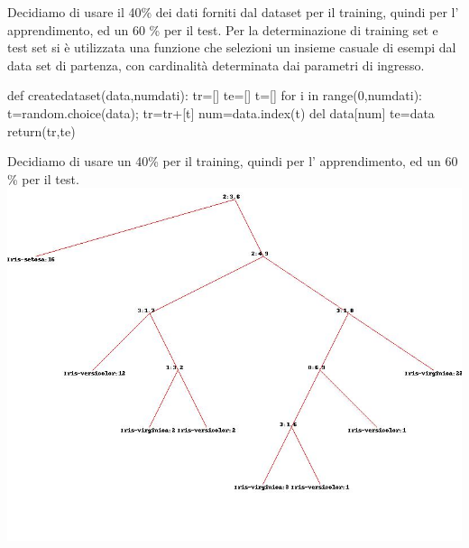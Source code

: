		Decidiamo di usare il 40\% dei dati forniti dal dataset per il training, quindi per l' apprendimento, ed un 60 \% per il test.
		Per la determinazione di training set e test set si è utilizzata una funzione che selezioni un insieme casuale di esempi dal data set di partenza, con cardinalità determinata dai parametri di ingresso.
		\bigskip
		\begin{python}
		def createdataset(data,numdati):
			tr=[]
			te=[]
			t=[]
			for i in range(0,numdati):
				t=random.choice(data);
				tr=tr+[t]
				num=data.index(t)
				del data[num]
			te=data
			return(tr,te)
		\end{python}
		Decidiamo di usare un 
		40\% per il training, quindi per l' apprendimento, ed un 60 \% per il test.
		\includegraphics[scale=0.37]{iris.jpg}
		
